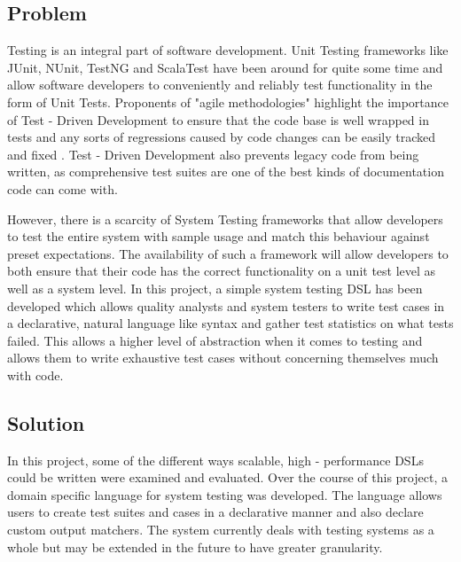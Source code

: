 \documentclass[12 pt]{article}
\begin{document}
\subsection{Problem}
Testing is an integral part of software development. Unit Testing frameworks like JUnit, NUnit, TestNG and ScalaTest have been around for quite some time and allow software developers to conveniently and reliably test functionality in the form of Unit Tests. Proponents of "agile methodologies" highlight the importance of Test - Driven Development to ensure that the code base is well wrapped in tests and any sorts of regressions caused by code changes can be easily tracked and fixed \cite{tdd}. Test - Driven Development also prevents legacy code from being written, as comprehensive test suites are one of the best kinds of documentation code can come with.
\bigskip

\noindent
However, there is a scarcity of System Testing frameworks that allow developers to test the entire system with sample usage and match this behaviour against preset expectations. The availability of such a framework will allow developers to both ensure that their code has the correct functionality on a unit test level as well as a system level. In this project, a simple system testing DSL has been developed which allows quality analysts and system testers to write test cases in a declarative, natural language like syntax and gather test statistics on what tests failed. This allows a higher level of abstraction when it comes to testing and allows them to write exhaustive test cases without concerning themselves much with code.

\subsection{Solution}
In this project, some of the different ways scalable, high - performance DSLs could be written were examined and evaluated. Over the course of this project, a domain specific language for system testing was developed. The language allows users to create test suites and cases in a declarative manner and also declare custom output matchers. The system currently deals with testing systems as a whole but may be extended in the future to have greater granularity.
\end{document}

